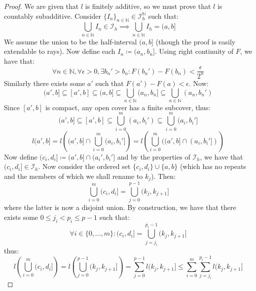 \documentclass[10pt,letterpaper]{article} %
\begin{document}
\begin{proof}
We are given that $l$ is finitely additive, so we must prove that $l$ is countably subadditive. Consider $\{I_n\}_{n \in \mathbb{N}} \in \mathcal{I}_h^\mathbb{N}$ such that:
\begin{equation*}
\bigcup_{n \in \mathbb{N}}I_n \in \mathcal{I}_h \implies \bigcup_{n \in \mathbb{N}}I_h = (a, b]
\end{equation*}
We assume the union to be the half-interval $(a, b]$ (though the proof is easily extendable to rays). Now define each $I_n \coloneq (a_n, b_n]$. Using right continuity of $F$, we have that:
\begin{equation*}
\forall n \in \mathbb{N}, \forall \epsilon > 0, \exists b_n' > b_n: F(b_n') - F(b_n) < \frac{\epsilon}{2^n}
\end{equation*}
Similarly there exists some $a'$ such that $F(a') - F(a) < \epsilon$. Now:
\begin{equation*}
(a', b] \subseteq [a', b] \subseteq (a, b] \subseteq \bigcup_{n \in \mathbb{N}}(a_n, b_n] \subseteq \bigcup_{n \in \mathbb{N}}(a_n, b_n')
\end{equation*}
Since $[a', b]$ is compact, any open cover has a finite subcover, thus:
\begin{equation*}
(a', b] \subseteq [a', b] \subseteq \bigcup_{i=0}^m (a_i, b_i') \subseteq \bigcup_{i=0}^m (a_i, b_i']
\end{equation*}
\begin{equation*}
l(a', b] = l\left((a', b] \cap \bigcup_{i=0}^m (a_i, b_i']\right) = l\left(\bigcup_{i=0}^m ((a', b] \cap (a_i, b_i'])\right)
\end{equation*}
Now define $(c_i, d_i] \coloneq (a', b] \cap (a_i', b_i']$ and by the properties of $\mathcal{I}_h$, we have that $(c_i, d_i] \in \mathcal{I}_h$. Now consider the ordered set $\{c_i, d_i\} \cup \{a, b\}$ (which has no repeats and the members of which we shall rename to $k_j$). Then:
\begin{equation*}
\bigcup_{i=0}^m (c_i, d_i] = \bigcup_{j=0}^{p-1}(k_j, k_{j+1}]
\end{equation*}
where the latter is now a disjoint union. By construction, we have that there exists some $0 \leqslant j_i < p_i \leqslant p-1$ such that:
\begin{equation*}
\forall i \in \{0, ..., m\}: (c_i, d_i] = \bigcup_{j=j_i}^{p_i - 1}(k_j, k_{j+1}]
\end{equation*}
thus:
\begin{equation*}
l\left(\bigcup_{i=0}^m (c_i, d_i]\right) = l\left(\bigcup_{j=0}^{p-1}(k_j, k_{j+1}]\right) = \sum_{j=0}^{p-1}l(k_j, k_{j+1}] \leqslant \sum_{i=0}^m \sum_{j=j_i}^{p_i - 1}l(k_j, k_{j+1}]

\end{equation*}
\end{proof}
\end{document}
